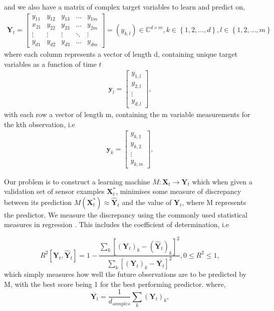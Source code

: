 and we also have a matrix of complex target variables to learn and predict on,
\begin{align*}
\textbf{Y}_{t}=\begin{bmatrix}
    y_{11} & y_{12} & y_{13} & \dots  & y_{1m} \\
    x_{21} & y_{22} & y_{23} & \dots  & y_{2m} \\
    \vdots & \vdots & \vdots & \ddots & \vdots \\
    y_{d1} & y_{d2} & y_{d3} & \dots  & y_{dm}
\end{bmatrix}=(y_{k,l}) \in  \mathbb{C}^{d \times m},  k\in \left\{1,2,\dots, d\right\}, l \in \left\{1,2,\dots,m\right\}
\end{align*}
where each column represents a vector of length d, containing unique target variables as a function of time $t$
\begin{align*}
\textbf{y}_{l}=\begin{bmatrix}
    y_{1,l}  \\
    y_{2,l} \\
    \vdots \\
    y_{d,l} 
\end{bmatrix},
\end{align*} 
with each row a vector of length m, containing the m variable measurements for the kth observation, i.e 
\begin{align*}
\textbf{y}_k=\begin{bmatrix}
    y_{k,1}  \\
    y_{k,2} \\
    \vdots \\
    y_{k,m} 
\end{bmatrix},
\end{align*}
 
Our problem is to construct a learning machine $M:\textbf{X}_{t} \rightarrow \textbf{Y}_{t}$ which when given a validation set of sensor examples $\textbf{X}^*_{t}$, minimises some measure of discrepancy between its prediction $M(\textbf{X}^*_{t})\approx\widehat{\textbf{Y}}_{t}$ and the value of $\textbf{Y}_{t}$, where M represents the predictor. We measure the discrepancy using the commonly used statistical measures in regression \citep{borchani2015survey}. This includes the coefficient of determination, i.e

\begin{equation}
R^2\left[\textbf{Y}_{t},\widehat{\textbf{Y}}_{t}\right]=1-\frac{\sum_{k} \left[(\textbf{Y}_{t})_{k}-(\widehat{\textbf{Y}}_{t})_{k}\right]^2}{\sum_{k}\left[(\textbf{Y}_{t})_{k}-\overline{\textbf{Y}_{t}}\right]^2}, 0 \leq R^2 \leq 1,
\label{R2score}
\end{equation}
which simply measures how well the future observations are to be predicted by M, with the best score being 1 for the best performing predictor. 
where,  \begin{equation}
\overline{\textbf{Y}_{t}}=\frac{1}{d_{samples}} \sum_{k} (\textbf{Y}_{t})_{k},
\end{equation} 

